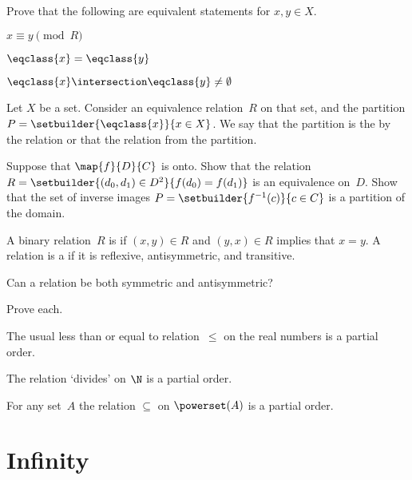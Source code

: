 \documentclass{ibl}
\begin{document}
\begin{ex} Prove that the following are equivalent statements for $x,y\in X$.
\begin{exes}
\item $x\equiv y\pmod R$
\item $\eqclass{x}=\eqclass{y}$    
\item $\eqclass{x}\intersection\eqclass{y}\neq \emptyset$
\end{exes}
\end{ex}

Let $X$ be a set. Consider an equivalence relation~$R$ on that set, 
and the partition $P=\setbuilder{\eqclass{x}}{x\in X}$.
We say that the partition is  
the  by the relation or that
the relation  from the partition. 

\begin{ex}
Suppose that $\map{f}{D}{C}$ is onto.
Show that the relation
$R=\setbuilder{(d_0,d_1)\in D^2}{f(d_0)=f(d_1)}$ 
is an equivalence on~$D$. 
Show that the set of inverse images 
$P=\setbuilder{f^{-1}(c)}{c\in C}$ is a partition of the domain.
\end{ex}

\begin{df}
A binary relation~$R$ is  if
$(x,y)\in R$ and $(y,x)\in R$ implies that $x=y$.
A relation is a  if it is 
reflexive, antisymmetric, and transitive.  
\end{df}

\begin{ex}
Can a relation be both symmetric and antisymmetric?  
\end{ex}

\begin{ex} Prove each.
\begin{exes}
\item The usual less than or equal to relation~$\leq$ on 
the real numbers is a partial order.
\item The relation `divides' on $\N$ is a partial order.
\item For any set~$A$ the relation $\subseteq$ on $\powerset(A)$ is
a partial order.
\end{exes}
\end{ex}





\chapter{Infinity}
\end{document}
